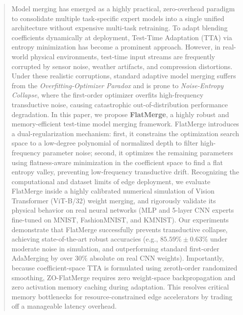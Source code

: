 \begin{abstract}
  Model merging has emerged as a highly practical, zero-overhead paradigm to consolidate multiple task-specific expert models into a single unified architecture without expensive multi-task retraining. 
  To adapt blending coefficients dynamically at deployment, Test-Time Adaptation (TTA) via entropy minimization has become a prominent approach. 
  However, in real-world physical environments, test-time input streams are frequently corrupted by sensor noise, weather artifacts, and compression distortions. 
  Under these realistic corruptions, standard adaptive model merging suffers from the \emph{Overfitting-Optimizer Paradox} and is prone to \emph{Noise-Entropy Collapse}, where the first-order optimizer overfits high-frequency transductive noise, causing catastrophic out-of-distribution performance degradation. 
  In this paper, we propose \textbf{FlatMerge}, a highly robust and memory-efficient test-time model merging framework. 
  FlatMerge introduces a dual-regularization mechanism: first, it constrains the optimization search space to a low-degree polynomial of normalized depth to filter high-frequency parameter noise; second, it optimizes the remaining parameters using flatness-aware minimization in the coefficient space to find a flat entropy valley, preventing low-frequency transductive drift. 
  Recognizing the computational and dataset limits of edge deployment, we evaluate FlatMerge inside a highly calibrated numerical simulation of Vision Transformer (ViT-B/32) weight merging, and rigorously validate its physical behavior on real neural networks (MLP and 5-layer CNN experts fine-tuned on MNIST, FashionMNIST, and KMNIST). 
  Our experiments demonstrate that FlatMerge successfully prevents transductive collapse, achieving state-of-the-art robust accuracies (e.g., $85.59\% \pm 0.63\%$ under moderate noise in simulation, and outperforming standard first-order AdaMerging by over $30\%$ absolute on real CNN weights). 
  Importantly, because coefficient-space TTA is formulated using zeroth-order randomized smoothing, ZO-FlatMerge requires zero weight-space backpropagation and zero activation memory caching during adaptation. This resolves critical memory bottlenecks for resource-constrained edge accelerators by trading off a manageable latency overhead.
\end{abstract}
